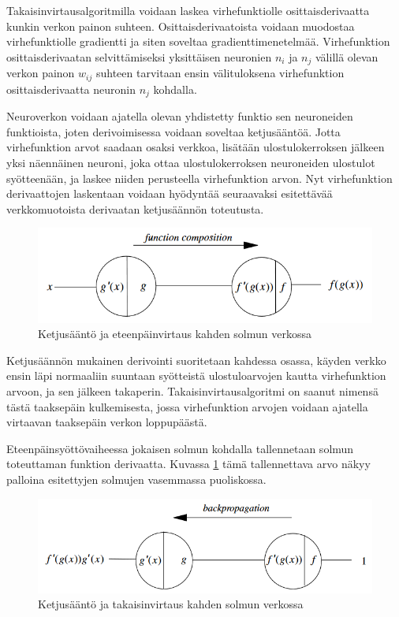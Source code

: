 \documentclass[finnish]{tktltiki2}
\theoremstyle{definition}
\theoremstyle{remark}
\begin{document}
  Takaisinvirtausalgoritmilla voidaan laskea virhefunktiolle osittaisderivaatta kunkin verkon painon suhteen. Osittaisderivaatoista voidaan muodostaa virhefunktiolle gradientti ja siten soveltaa gradienttimenetelmää. Virhefunktion osittaisderivaatan selvittämiseksi yksittäisen neuronien $n_i$ ja $n_j$ välillä olevan verkon painon $w_{ij}$ suhteen tarvitaan ensin välituloksena virhefunktion osittaisderivaatta neuronin $n_j$ kohdalla. 

  Neuroverkon voidaan ajatella olevan yhdistetty funktio sen neuroneiden funktioista, joten derivoimisessa voidaan soveltaa ketjusääntöä. Jotta virhefunktion arvot saadaan osaksi verkkoa, lisätään ulostulokerroksen jälkeen yksi näennäinen neuroni, joka ottaa ulostulokerroksen neuroneiden ulostulot syötteenään, ja laskee niiden perusteella virhefunktion arvon. Nyt virhefunktion derivaattojen laskentaan voidaan hyödyntää seuraavaksi esitettävää verkkomuotoista derivaatan ketjusäännön toteutusta. 
    
  \begin{figure}[h]
    \centering
    \includegraphics[scale=0.5]{function-composition}
    \caption{Ketjusääntö ja eteenpäinvirtaus kahden solmun verkossa \cite{Rojas96}}
    \label{pic:composition}
  \end{figure}

  Ketjusäännön mukainen derivointi suoritetaan kahdessa osassa, käyden verkko ensin läpi normaaliin suuntaan syötteistä ulostuloarvojen kautta virhefunktion arvoon, ja sen jälkeen takaperin. Takaisinvirtausalgoritmi on saanut nimensä tästä taaksepäin kulkemisesta, jossa virhefunktion arvojen voidaan ajatella virtaavan taaksepäin verkon loppupäästä.
  
  Eteenpäinsyöttövaiheessa jokaisen solmun kohdalla tallennetaan solmun toteuttaman funktion derivaatta. Kuvassa \ref{pic:composition} tämä tallennettava arvo näkyy palloina esitettyjen solmujen vasemmassa puoliskossa.

  \begin{figure}[h]
    \centering
    \includegraphics[scale=0.5]{backpropagation}
    \caption{Ketjusääntö ja takaisinvirtaus kahden solmun verkossa \cite{Rojas96}}
    \label{pic:backpropagation}
  \end{figure}
\end{document}
